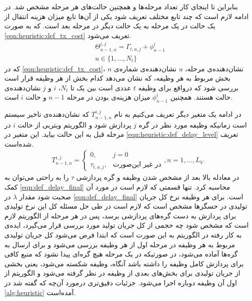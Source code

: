 	بنابراین تا اینجای کار تعداد مرحله‌ها و همچنین حالت‌های هر مرحله مشخص شد. در ادامه لازم است که چند تابع مختلف تعریف شود یکی از آن‌ها تابع میزان هزینه انتقال از یک حالت در یک مرحله به یک حالت دیگر در مرحله بعد است. که به صورت \cref{eqn:heuristic:def_tx_cost} تعریف می‌شود. 
	\begin{align}\label{eqn:heuristic:def_tx_cost}
		&\Theta_{n-1,n}^{i,j} = \Gamma_{t,u,j} + \phi_{n-1}^i \\
		&u \in \{1, \dots, N_t\}
	\end{align}
که در \cref{eqn:heuristic:def_tx_cost}، $n$ نشان‌دهنده‌ی مرحله، $u$ نشان‌دهنده‌ی شماره‌ی بخش مربوط به هر وظیفه، که نشان می‌دهد کدام بخش از هر وظیفه قرار است بررسی شود که درواقع برای وظیفه $t$ عددی است بین یک تا $N_t$، $i$ و $j$ نشان‌دهنده‌ی حالت هستند. همچنین $\phi_{n-1}^i$ میزان هزینه‌ی بودن در مرحله $n-1$ و حالت $i$ است. 
	
	در ادامه یک متغیر دیگر تعریف می‌کنیم به نام $T_{n-1,n}^{i,j}$ که نشان‌دهنده‌ی تاخیر سیستم است زمانیکه وظیفه مورد نظر در گره $j$ پردازش شود و الگوریتم ویتربی از حالت $i$ در مرحله قبل به این حالت بیاید. این متغیر در \cref{eqn:heuristic:def_delay_level} تعریف شده‌است. 
	\begin{align}\label{eqn:heuristic:def_delay_level}
		T_{n-1,n}^{i,j} =
		\begin{cases}
			0,				& \text{$j = 0$} \\
			\tau_{t,u,j},  	& \text{در غیر این‌صورت}
		\end{cases}
		,n = 1, \dots, L_V
	\end{align}
	در معادله بالا بعد از مشخص شدن وظیفه و گره پردازشی $\tau$ را به راحتی می‌توان به کمک \cref{eqn:def_delay_final} محاسبه کرد. تنها قسمتی که لازم است در مورد آن صحبت شود مقدار $\lambda$ در \cref{eqn:def_delay_final} است. برای هر وظیفه نرخ کل جریان تولیدی در حسگرها مشخص است که لازم است در طی حل مسئله کل این نرخ تولیدی برای پردازش به دست گره‌های پردازشی برسد، پس در هر مرحله از الگوریتم لازم است که مشخص شود چه حجمی از کل جریان تولید مورد بررسی قرار می‌گیرد، ایده‌ی به کار رفته در الگوریتم به این صورت است که ابتدا فرض می‌شود کل جریان تولیدی مربوط به هر وظیفه در مرحله اول از هر وظیفه بررسی می‌شود و برای ارسال به گره‌ها آماده می‌شود، در صورتیکه در یک مرحله هیچ گره‌ای پیدا نشود که منبع کافی برای پردازش کامل وظیفه را داشته باشد آنگاه، وظیفه شکسته می‌شود، یعنی بخشی از جریان تولیدی برای بخش‌های بعدی از وظیفه در نظر گرفته می‌شود و الگوریتم از اول آن وظیفه دوباره اجرا می‌شود. جزئیات دقیق‌تری درمورد آن‌چه که گفته شد در \cref{alg:heuristic} آمده‌است. 
	
